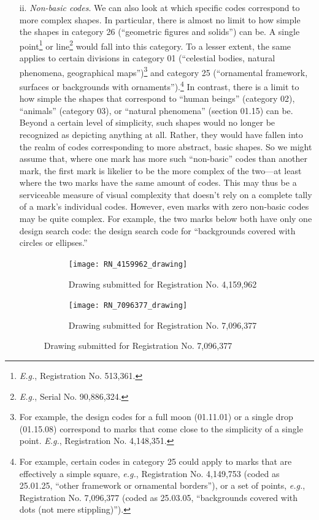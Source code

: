 \documentclass[letterpaper, 11pt, oneside]{article}
\begin{document}
\begin{enumerate}
\item[ii.] \textit{Non-basic codes}. We can also look at which specific codes correspond to more complex shapes. In particular, there is almost no limit to how simple the shapes in category 26 (``geometric figures and solids'') can be. A single point\footnote{\textit{E.g.}, Registration No. 513,361.} or line\footnote{\textit{E.g.}, Serial No. 90,886,324.} would fall into this category. To a lesser extent, the same applies to certain divisions in category 01 (``celestial bodies, natural phenomena, geographical maps'')\footnote{For example, the design codes for a full moon (01.11.01) or a single drop (01.15.08) correspond to marks that come close to the simplicity of a single point. \textit{E.g.}, Registration No. 4,148,351.} and category 25 (``ornamental framework, surfaces or backgrounds with ornaments'').\footnote{For example, certain codes in category 25 could apply to marks that are effectively a simple square, \textit{e.g.}, Registration No. 4,149,753 (coded as 25.01.25, ``other framework or ornamental borders''), or a set of points, \textit{e.g.}, Registration No. 7,096,377 (coded as 25.03.05, ``backgrounds covered with dots (not mere stippling)'').} In contrast, there is a limit to how simple the shapes that correspond to ``human beings'' (category 02), ``animals'' (category 03), or ``natural phenomena'' (section 01.15) can be. Beyond a certain level of simplicity, such shapes would no longer be recognized as depicting anything at all. Rather, they would have fallen into the realm of codes corresponding to more abstract, basic shapes. So we might assume that, where one mark has more such ``non-basic'' codes than another mark, the first mark is likelier to be the more complex of the two—at least where the two marks have the same amount of codes. This may thus be a serviceable measure of visual complexity that doesn't rely on a complete tally of a mark's individual codes. However, even marks with zero non-basic codes may be quite complex. For example, the two marks below both have only one design search code: the design search code for ``backgrounds covered with circles or ellipses.''

\begin{figure}[H]
\centering
\begin{subfigure}[h]{0.4\linewidth}
\texttt{[image: RN\_4159962\_drawing]} \
\caption{Drawing submitted for Registration No. 4,159,962}
\end{subfigure}
\hspace{30pt}
\begin{subfigure}[h]{0.275\linewidth}
\texttt{[image: RN\_7096377\_drawing]} \
\caption{Drawing submitted for Registration No. 7,096,377}
\end{subfigure}
\end{figure}
\par



\end{enumerate}
\end{document}
